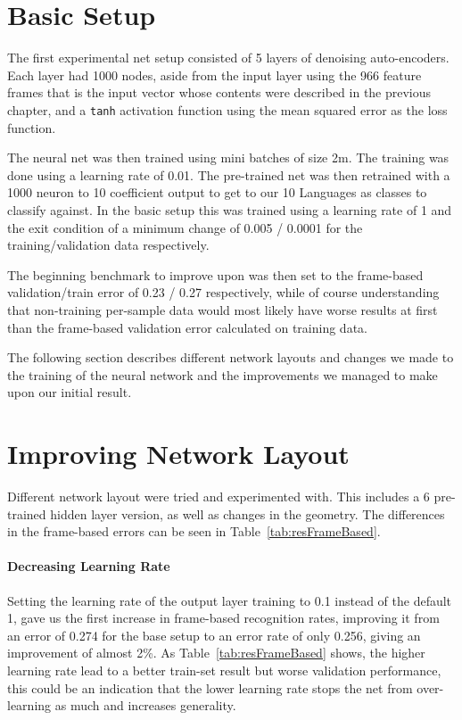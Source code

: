\section{Basic Setup}
\label{sec:LIDNetwork:Basic}

The first experimental net setup consisted of 5 layers of denoising auto-encoders. Each layer had 1000 nodes, aside from the input layer using the 966 feature frames that is the input vector whose contents were described in the previous chapter, and a \texttt{tanh} activation function using the mean squared error as the loss function. 

The neural net was then trained using mini batches of size 2m. The training was done using a learning rate of 0.01. The pre-trained net was then retrained with a 1000 neuron to 10 coefficient output to get to our 10 Languages as classes to classify against. In the basic setup this was trained using a learning rate of 1 and the exit condition of a minimum change of 0.005 / 0.0001 for the training/validation data respectively.

The beginning benchmark to improve upon was then set to the frame-based validation/train error of 0.23 / 0.27 respectively, while of course understanding that non-training per-sample data would most likely have worse results at first than the frame-based validation error calculated on training data.

The following section describes different network layouts and changes we made to the training of the neural network and the improvements we managed to make upon our initial result.

\section{Improving Network Layout}
\label{sec:LIDNetwork:Layout}

Different network layout were tried and experimented with. This includes a 6 pre-trained hidden layer version, as well as changes in the geometry. The differences in the frame-based errors can be seen in Table~\ref{tab:resFrameBased}. 

\paragraph{Decreasing Learning Rate} Setting the learning rate of the output layer training to 0.1 instead of the default 1, gave us the first increase in frame-based recognition rates, improving it from an error of 0.274 for the base setup to an error rate of only 0.256, giving an improvement of almost 2\%. As Table~\ref{tab:resFrameBased} shows, the higher learning rate lead to a better train-set result but worse validation performance, this could be an indication that the lower learning rate stops the net from over-learning as much and increases generality.

